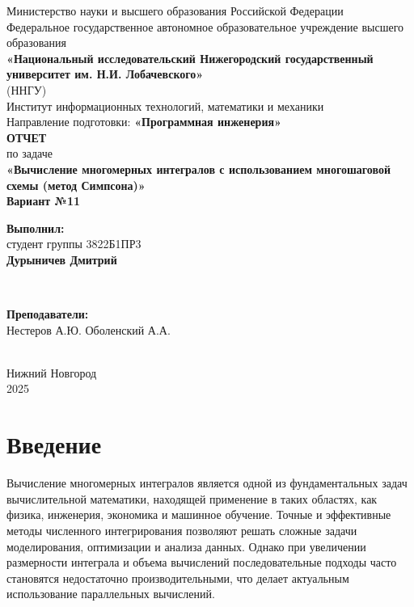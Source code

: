 \documentclass[12pt]{article}
\begin{document}
\begin{titlepage}
    \centering
    \large
    Министерство науки и высшего образования Российской Федерации\\[0.5cm]
    Федеральное государственное автономное образовательное учреждение высшего образования\\[0.5cm]
    \textbf{«Национальный исследовательский Нижегородский государственный университет им. Н.И. Лобачевского»}\\
    (ННГУ)\\[1cm]
    Институт информационных технологий, математики и механики\\[0.5cm]
    Направление подготовки: \textbf{«Программная инженерия»}\\[2cm]

    \vfill
    {\LARGE \textbf{ОТЧЕТ}}\\[0.5cm]
    {\Large по задаче}\\[0.5cm]
    {\LARGE \textbf{«Вычисление многомерных интегралов с использованием многошаговой схемы (метод Симпсона)»}}\\[0.5cm]
    {\Large \textbf{Вариант №11}}\\[2.5cm]

    \hfill\parbox{0.5\textwidth}{
        \textbf{Выполнил:} \\
        студент группы 3822Б1ПР3 \\
        \textbf{Дурыничев Дмитрий}
    }\\[0.5cm]

    \hfill\parbox{0.5\textwidth}{
        \textbf{Преподаватели:} \\
        Нестеров А.Ю.
        Оболенский А.А.

    }\\[2cm]

    Нижний Новгород\\
    2025
\end{titlepage}


\thispagestyle{empty}
\clearpage
{} 
\setcounter{page}{2} 
\tableofcontents
\clearpage
\setcounter{page}{3} 
\section{Введение}

\hspace*{1.25em}Вычисление многомерных интегралов является одной из фундаментальных задач вычислительной математики, находящей применение в таких областях, как физика, инженерия, экономика и машинное обучение. Точные и эффективные методы численного интегрирования позволяют решать сложные задачи моделирования, оптимизации и анализа данных. Однако при увеличении размерности интеграла и объема вычислений последовательные подходы часто становятся недостаточно производительными, что делает актуальным использование параллельных вычислений.
\end{document}

